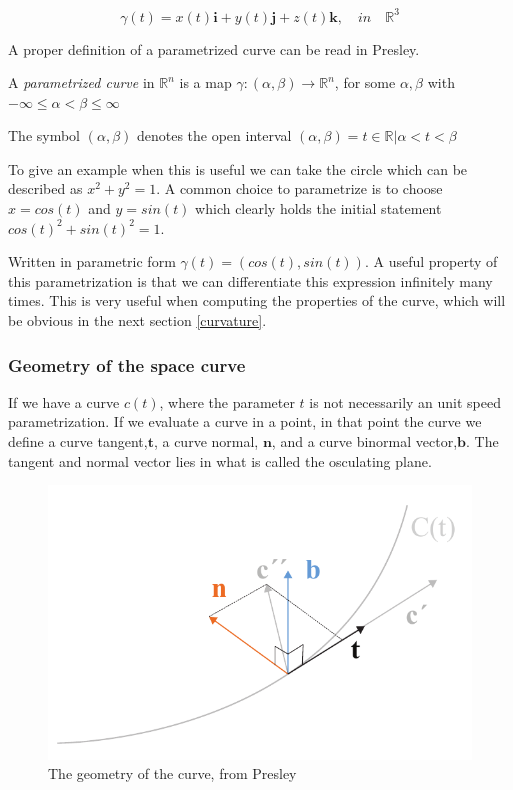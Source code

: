 \begin{equation}
\gamma(t) = x(t)\textbf{i} +  y(t)\textbf{j}+  z(t)\textbf{k},\quad in\quad \mathbb{R}^3
\end{equation}

A proper definition of a parametrized curve can be read in Presley.

\vspace{5mm} %

A \textit{parametrized curve} in $\mathbb{R}^n$ is a map $\gamma : (\alpha,\beta) \rightarrow \mathbb{R}^n $, for some $\alpha,\beta$ with $-\infty\leqslant\alpha<\beta\leqslant\infty$ 

The symbol $(\alpha,\beta)$ denotes the open interval $(\alpha,\beta) = {t\in \mathbb{R} | \alpha < t < \beta}$

\vspace{5mm} %

To give an example when this is useful we can take the circle which can be described as $x^2+y^2=1$. A common choice to parametrize is to choose $x = cos(t)$ and $y = sin(t)$ which clearly holds the initial statement $cos(t)^2 + sin(t)^2 = 1$.  

Written in parametric form $\gamma(t) = (cos(t),sin(t))$. A useful property of this parametrization is that we can differentiate this expression infinitely many times. This is very useful when computing the properties of the curve, which will be obvious in the next section \ref{curvature}.

\subsubsection{Geometry of the space curve} \label{GeoSpaceCurve}

If we have a curve $c(t)$, where the parameter $t$ is not necessarily an unit speed parametrization. If we evaluate a curve in a point, in that point the curve we define a curve tangent,$\textbf{t}$, a curve normal, $\textbf{n}$, and a curve binormal vector,$\textbf{b}$. The tangent and normal vector lies in what is called the osculating plane.

\begin{figure}[H]
\centering
\includegraphics[width=0.7\linewidth ]{figure/Theory/CurveGeometry.pdf}              
\caption{The geometry of the curve, from Presley }
\end{figure}



